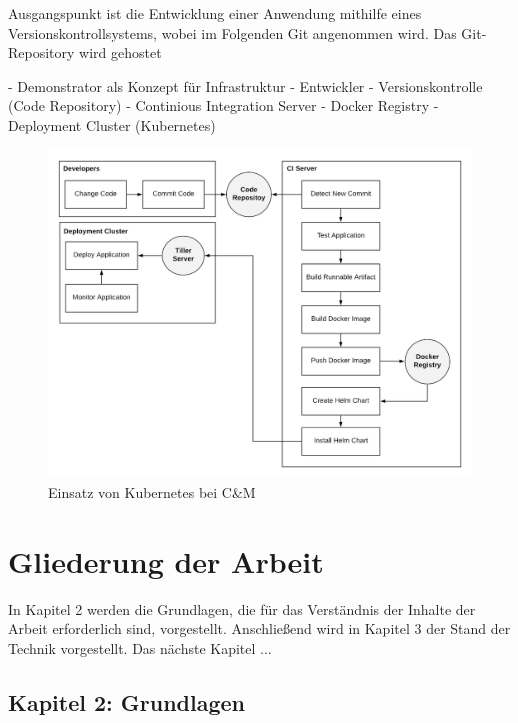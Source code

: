 Ausgangspunkt ist die Entwicklung einer Anwendung mithilfe eines Versionskontrollsystems, wobei im Folgenden Git angenommen wird. 
Das Git-Repository wird gehostet 

- Demonstrator als Konzept für Infrastruktur
	- Entwickler
	- Versionskontrolle (Code Repository)
	- Continious Integration Server
	- Docker Registry
	- Deployment Cluster (Kubernetes)


\begin{figure}[h]
	\centering
	\includegraphics[width=\textwidth]{images/demonstrator.png}
	\caption{Einsatz von Kubernetes bei C\&M}
	\label{fig:demonstrator}
\end{figure}

\section{Gliederung der Arbeit}
\label{sec:gliederung}

In Kapitel 2 werden die Grundlagen, die für das Verständnis der Inhalte der Arbeit erforderlich sind, vorgestellt.
Anschließend wird in Kapitel 3 der Stand der Technik vorgestellt.
Das nächste Kapitel ...


\newpage
\subsection*{Kapitel 2: Grundlagen}



